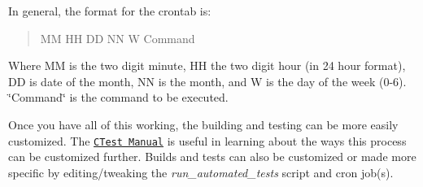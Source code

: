 In general, the format for the crontab is\+: \begin{quote}
MM HH DD NN W Command \end{quote}
Where MM is the two digit minute, HH the two digit hour (in 24 hour format), DD is date of the month, NN is the month, and W is the day of the week (0-\/6). \char`\"{}\+Command\char`\"{} is the command to be executed.

Once you have all of this working, the building and testing can be more easily customized. The \href{http://www.cmake.org/cmake/help/v2.8.8/ctest.html}{\tt C\+Test Manual} is useful in learning about the ways this process can be customized further. Builds and tests can also be customized or made more specific by editing/tweaking the {\itshape run\+\_\+automated\+\_\+tests} script and cron job(s). 